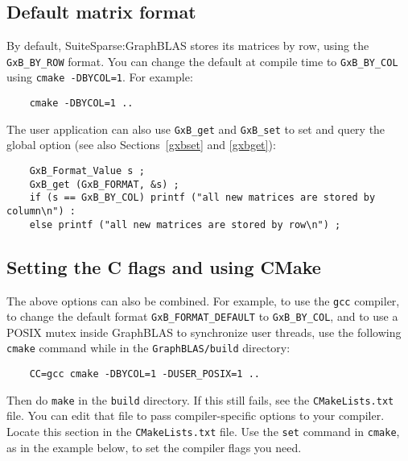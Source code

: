 \documentclass[12pt]{article}
\begin{document}
\subsection{Default matrix format}

By default, SuiteSparse:GraphBLAS stores its matrices by row, using the
\verb'GxB_BY_ROW' format.  You can change the default at compile time to
\verb'GxB_BY_COL' using \verb'cmake -DBYCOL=1'.  For example:

    {\small
    \begin{verbatim}
    cmake -DBYCOL=1 ..  \end{verbatim} }

The user application can also use \verb'GxB_get' and \verb'GxB_set' to set and
query the global option (see also Sections~\ref{gxbset} and \ref{gxbget}):

    {\small
    \begin{verbatim}
    GxB_Format_Value s ;
    GxB_get (GxB_FORMAT, &s) ;
    if (s == GxB_BY_COL) printf ("all new matrices are stored by column\n") :
    else printf ("all new matrices are stored by row\n") ; \end{verbatim} }

\subsection{Setting the C flags and using CMake}

The above options can also be combined.  For example, to use the \verb'gcc'
compiler, to change the default format \verb'GxB_FORMAT_DEFAULT' to
\verb'GxB_BY_COL', and to use a POSIX mutex inside GraphBLAS to synchronize
user threads, use the following \verb'cmake' command while in the
\verb'GraphBLAS/build' directory:

    {\small
    \begin{verbatim}
    CC=gcc cmake -DBYCOL=1 -DUSER_POSIX=1 .. \end{verbatim}}

\noindent
Then do \verb'make' in the \verb'build' directory.  If this still fails, see
the \verb'CMakeLists.txt' file.  You can edit that file to pass
compiler-specific options to your compiler.  Locate this section in the
\verb'CMakeLists.txt' file.  Use the \verb'set' command in \verb'cmake', as in
the example below, to set the compiler flags you need.
\end{document}
